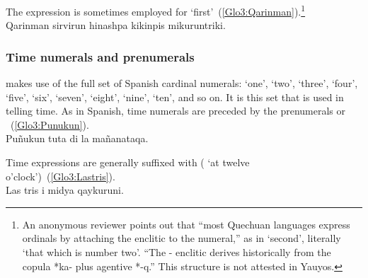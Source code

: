 {\noindent
The expression  is sometimes employed for ‘first’~(\ref{Glo3:Qarinman}).\footnote{An anonymous reviewer points out that “most Quechuan languages express ordinals by attaching the enclitic  to the numeral,” as in  ‘second’, literally ‘that which is number two’. “The - enclitic derives historically from the copula *ka- plus agentive *-q.” This structure is not attested in Yauyos.}\\

%
{Qarinman sirvirun  hinashpa kikinpis mikuruntriki.}%
{}%
{}{}%

\subsubsection{Time numerals and prenumerals}\label{ssec:timenum}
\SYQ{} makes use of the full set of Spanish cardinal numerals:  ‘one’,  ‘two’,  ‘three’,  ‘four’,  ‘five’,  ‘six’,  ‘seven’,  ‘eight’,  ‘nine’,  ‘ten’, and so on. It is this set that is used in telling time. As in Spanish, time numerals are preceded by the prenumerals  or ~(\ref{Glo3:Punukun}).\\

%
{Puñukun tuta  di la mañanataqa.}%
{}%
{}{}%

\noindent
Time expressions are generally suffixed with  ( ‘at twelve o’clock’)~(\ref{Glo3:Lastris}).\\

%
{Las tris i midya qaykuruni.}%
{}%
{}{}%

}
